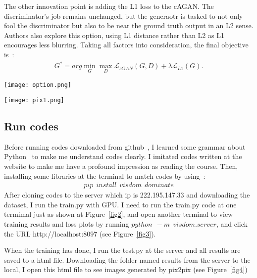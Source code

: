 \documentclass[a4paper]{article}
\begin{document}
The other innovation point is adding the L1 loss to the cAGAN. The discriminator's job remains unchanged, but the generaotr is tasked to not only fool the discriminator but also to be near the ground truth output in an L2 sense. Authors also explore this option, using L1 distance rather than L2 as L1 encourages less blurring. Taking all factors into consideration, the final objective is~\cite{Image}:\\
\begin{gather}
G^{\ast} = arg\mathop{\min}\limits_G\mathop{\max}\limits_D\mathcal{L}_{cGAN}(G, D) + \lambda\mathcal{L}_{L1}(G).
\end{gather} 

\begin{figure*}
\begin{center}
\texttt{[image: option.png]}
\end{center}
\caption{The start of running pix2pix.}
\label{fig2}
\end{figure*}

\begin{figure*}
\begin{center}
\texttt{[image: pix1.png]}
\end{center}
\caption{The result of pix2pix.}
\label{fig3}
\end{figure*}

\subsection{Run codes}

Before running codes downloaded from github~\cite{Git}, I learned some grammar about Python~\cite{Xuefeng} to make me understand codes clearly. I imitated codes written at the website to make me have a profound impression as reading the course. Then, installing some libraries at the terminal to match codes by using~\cite{Git}:\\
\begin{gather}
pip~~install~~visdom~~dominate
\end{gather} 
After cloning codes to the server which ip is 222.195.147.33 and downloading the dataset, I run the train.py with GPU. I need to run the train.py code at one termimal just as shown at Figure~\ref{fig2}, and open another terminal to view training results and loss plots by running $python~~-m~~visdom.server$, and click the URL http://localhost:8097 (see Figure~\ref{fig3}). 

When the training has done, I run the test.py at the server and all results are saved to a html file. Downloading the folder named results from the server to the local, I open this html file to see images generated by pix2pix (see Figure~\ref{fig4})
\end{document}
